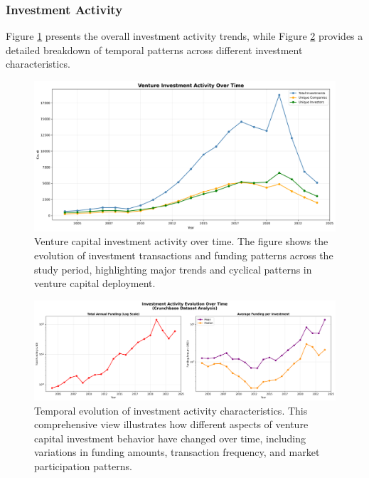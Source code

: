 \subsubsection{Investment Activity}

Figure \ref{fig:vc_investment_activity} presents the overall investment activity trends, while Figure \ref{fig:investment_temporal_evolution} provides a detailed breakdown of temporal patterns across different investment characteristics.

\begin{figure}[htbp]
\centering
\includegraphics[width=1\textwidth]{../figures/us/vc_investment_activity_over_time.png}
\caption{Venture capital investment activity over time. The figure shows the evolution of investment transactions and funding patterns across the study period, highlighting major trends and cyclical patterns in venture capital deployment.}
\label{fig:vc_investment_activity}
\end{figure}

\begin{figure}[htbp]
\centering
\includegraphics[width=1\textwidth]{../figures/us/investment_funding_temporal_evolution.png}
\caption{Temporal evolution of investment activity characteristics. This comprehensive view illustrates how different aspects of venture capital investment behavior have changed over time, including variations in funding amounts, transaction frequency, and market participation patterns.}
\label{fig:investment_temporal_evolution}
\end{figure}

